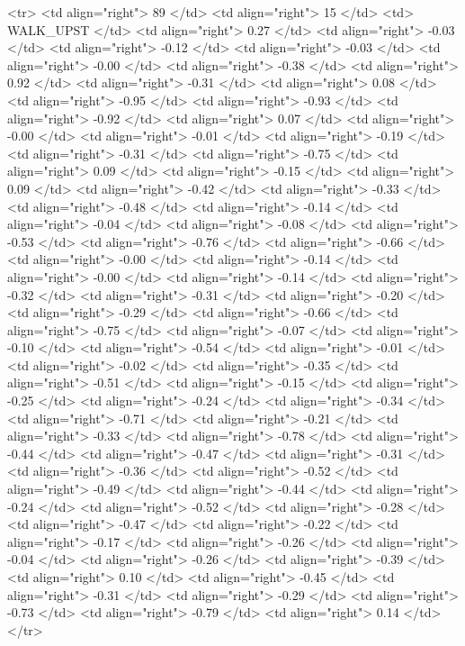   <tr> <td align="right"> 89 </td> <td align="right">  15 </td> <td> WALK_UPST </td> <td align="right"> 0.27 </td> <td align="right"> -0.03 </td> <td align="right"> -0.12 </td> <td align="right"> -0.03 </td> <td align="right"> -0.00 </td> <td align="right"> -0.38 </td> <td align="right"> 0.92 </td> <td align="right"> -0.31 </td> <td align="right"> 0.08 </td> <td align="right"> -0.95 </td> <td align="right"> -0.93 </td> <td align="right"> -0.92 </td> <td align="right"> 0.07 </td> <td align="right"> -0.00 </td> <td align="right"> -0.01 </td> <td align="right"> -0.19 </td> <td align="right"> -0.31 </td> <td align="right"> -0.75 </td> <td align="right"> 0.09 </td> <td align="right"> -0.15 </td> <td align="right"> 0.09 </td> <td align="right"> -0.42 </td> <td align="right"> -0.33 </td> <td align="right"> -0.48 </td> <td align="right"> -0.14 </td> <td align="right"> -0.04 </td> <td align="right"> -0.08 </td> <td align="right"> -0.53 </td> <td align="right"> -0.76 </td> <td align="right"> -0.66 </td> <td align="right"> -0.00 </td> <td align="right"> -0.14 </td> <td align="right"> -0.00 </td> <td align="right"> -0.14 </td> <td align="right"> -0.32 </td> <td align="right"> -0.31 </td> <td align="right"> -0.20 </td> <td align="right"> -0.29 </td> <td align="right"> -0.66 </td> <td align="right"> -0.75 </td> <td align="right"> -0.07 </td> <td align="right"> -0.10 </td> <td align="right"> -0.54 </td> <td align="right"> -0.01 </td> <td align="right"> -0.02 </td> <td align="right"> -0.35 </td> <td align="right"> -0.51 </td> <td align="right"> -0.15 </td> <td align="right"> -0.25 </td> <td align="right"> -0.24 </td> <td align="right"> -0.34 </td> <td align="right"> -0.71 </td> <td align="right"> -0.21 </td> <td align="right"> -0.33 </td> <td align="right"> -0.78 </td> <td align="right"> -0.44 </td> <td align="right"> -0.47 </td> <td align="right"> -0.31 </td> <td align="right"> -0.36 </td> <td align="right"> -0.52 </td> <td align="right"> -0.49 </td> <td align="right"> -0.44 </td> <td align="right"> -0.24 </td> <td align="right"> -0.52 </td> <td align="right"> -0.28 </td> <td align="right"> -0.47 </td> <td align="right"> -0.22 </td> <td align="right"> -0.17 </td> <td align="right"> -0.26 </td> <td align="right"> -0.04 </td> <td align="right"> -0.26 </td> <td align="right"> -0.39 </td> <td align="right"> 0.10 </td> <td align="right"> -0.45 </td> <td align="right"> -0.31 </td> <td align="right"> -0.29 </td> <td align="right"> -0.73 </td> <td align="right"> -0.79 </td> <td align="right"> 0.14 </td> </tr>
